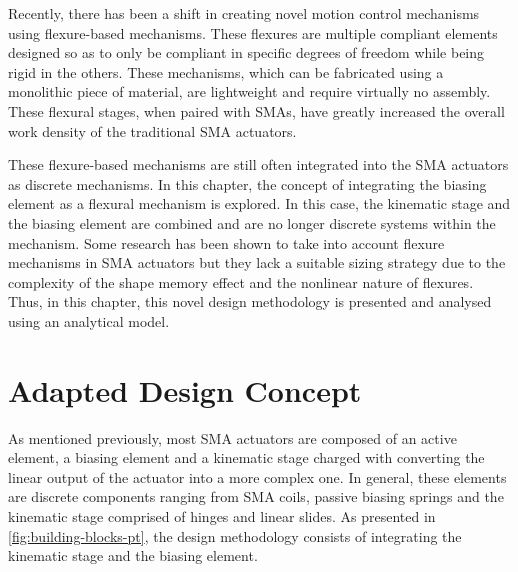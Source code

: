 
Recently, there has been a shift in creating novel motion control mechanisms using flexure-based mechanisms. These flexures are multiple compliant elements designed so as to only be compliant in specific degrees of freedom while being rigid in the others. These mechanisms, which can be fabricated using a monolithic piece of material, are lightweight and require virtually no assembly. These flexural stages, when paired with SMAs, have greatly increased the overall work density of the traditional SMA actuators\todocite.


These flexure-based mechanisms are still often integrated into the SMA actuators as discrete mechanisms. In this chapter, the concept of integrating the biasing element as a flexural mechanism is explored. In this case, the kinematic stage and the biasing element are combined and are no longer discrete systems within the mechanism. Some research has been shown to take into account flexure mechanisms in SMA actuators but they lack a suitable sizing strategy due to the complexity of the shape memory effect and the nonlinear nature of flexures\todocite. Thus, in this chapter, this novel design methodology is presented and analysed using an analytical model.

\section{Adapted Design Concept}
As mentioned previously, most SMA actuators are composed of an active element, a biasing element and a kinematic stage charged with converting the linear output of the actuator into a more complex one. In general, these elements are discrete components ranging from SMA coils, passive biasing springs and the kinematic stage comprised of hinges and linear slides. As presented in \cref{fig:building-blocks-pt}, the design methodology consists of integrating the kinematic stage and the biasing element.

